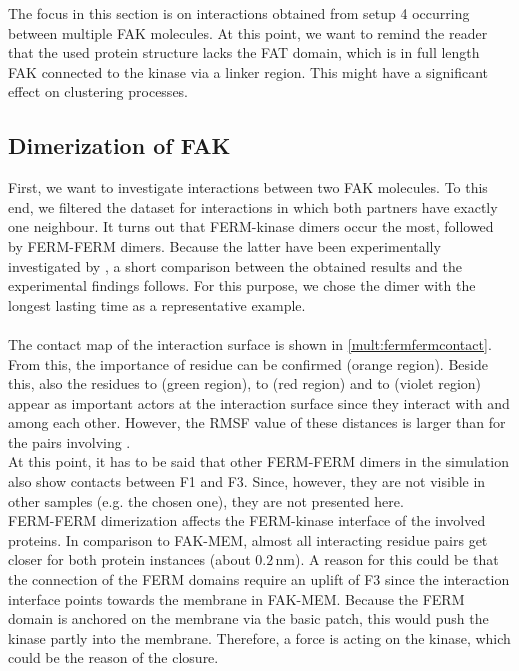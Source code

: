 \label{multiProt}
The focus in this section is on interactions obtained from setup 4 occurring between multiple FAK molecules. At this point, we want to remind the reader that the used protein structure lacks the FAT domain, which is in full length FAK connected to the kinase via a linker region. This might have a significant effect on clustering processes.
\subsection{Dimerization of FAK}
\label{mult:dimers}
First, we want to investigate interactions between two FAK molecules. To this end, we filtered the dataset for interactions in which both partners have exactly one neighbour. It turns out that FERM-kinase dimers occur the most, followed by FERM-FERM dimers. Because the latter have been experimentally investigated by \textcite{fakdimers}, a short comparison between the obtained results and the experimental findings follows. For this purpose, we chose the dimer with the longest lasting time as a representative example.\\ %
\\
The contact map of the interaction surface is shown in \autoref{mult:fermfermcontact}. From this, the importance of residue  can be confirmed (orange region). Beside this, also the residues  to  (green region),  to  (red region) and  to  (violet region) appear as important actors at the interaction surface since they interact with  and among each other. However, the RMSF value of these distances is larger than for the pairs involving .\\
At this point, it has to be said that other FERM-FERM dimers in the simulation also show contacts between F1 and F3. Since, however, they are not visible in other samples (e.g. the chosen one), they are not presented here.\\
FERM-FERM dimerization affects the FERM-kinase interface of the involved proteins. In comparison to FAK-MEM, almost all interacting residue pairs get closer for both protein instances (about $0.2\,\si{\nano\metre}$). A reason for this could be that the connection of the FERM domains require an uplift of F3 since the interaction interface points towards the membrane in FAK-MEM. Because the FERM domain is anchored on the membrane via the basic patch, this would push the kinase partly into the membrane. Therefore, a force is acting on the kinase, which could be the reason of the closure.
